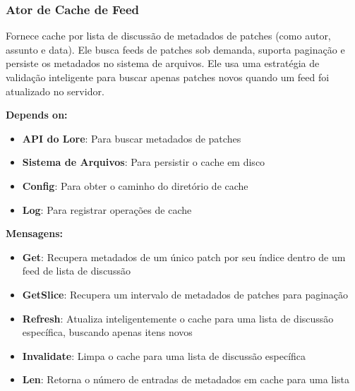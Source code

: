 \subsubsection{Ator de Cache de Feed}

Fornece cache por lista de discussão de metadados de patches (como autor, assunto e data). Ele busca feeds de patches sob demanda, suporta paginação e persiste os metadados no sistema de arquivos. Ele usa uma estratégia de validação inteligente para buscar apenas patches novos quando um feed foi atualizado no servidor.

\textbf{Depends on:}

\begin{itemize}
    \item \textbf{API do Lore}: Para buscar metadados de patches
    \item \textbf{Sistema de Arquivos}: Para persistir o cache em disco
    \item \textbf{Config}: Para obter o caminho do diretório de cache
    \item \textbf{Log}: Para registrar operações de cache
\end{itemize}

\textbf{Mensagens:}

\begin{itemize}
    \item \textbf{Get}: Recupera metadados de um único patch por seu índice dentro de um feed de lista de discussão
    \item \textbf{GetSlice}: Recupera um intervalo de metadados de patches para paginação
    \item \textbf{Refresh}: Atualiza inteligentemente o cache para uma lista de discussão específica, buscando apenas itens novos
    \item \textbf{Invalidate}: Limpa o cache para uma lista de discussão específica
    \item \textbf{Len}: Retorna o número de entradas de metadados em cache para uma lista
\end{itemize}
